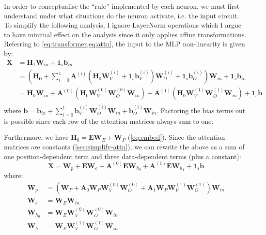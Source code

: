 \documentclass{article}
\renewcommand{\v}[1]{\mathbf{\bm{#1}}}
\newcommand{\m}[1]{\mathbf{\bm{#1}}}
\begin{document}
In order to conceptualise the ``rule'' implemented by each neuron, we must first understand under what situations do the neuron activate, i.e. the input circuit. To simplify the following analysis, I ignore LayerNorm operations which I argue to have minimal effect on the analysis since it only applies affine transformations. Referring to \cref{eq:transformer,eq:attn}, the input to the MLP non-linearity is given by:
\begin{equation*}
    \begin{aligned}
        \m{X} & = \m{H}_1 \m{W}_{in} + \v{1}_s \v{b}_{in} \\
              & = \left(
        \m{H_0}
        + \sum_{i=0}^1 \m{A}^{(i)} (
        \m{H}_0 \m{W}_V^{(i)} + \v{1}_s \v{b}_V^{(i)}
        ) \m{W}_O^{(i)} + \v{1}_s \v{b}_O^{(i)}
        \right) \m{W}_{in} + \v{1}_s \v{b}_{in}           \\
              & = \m{H}_0 \m{W}_{in}
        + \m{A}^{(0)} (\m{H}_0 \m{W}_V^{(0)} \m{W}_O^{(0)} \m{W}_{in})
        + \m{A}^{(1)} (\m{H}_0 \m{W}_V^{(1)} \m{W}_O^{(1)} \m{W}_{in})
        + \v{1}_s \v{b}                                   \\
    \end{aligned}
\end{equation*}
where $\v{b} = \v{b}_{in} + \sum_{i=0}^{1} \v{b}_V^{(i)} \m{W}_O^{(i)} \m{W}_{in} + \v{b}_O^{(i)} \m{W}_{in}$. Factoring the bias terms out is possible since each row of the attention matrices always sum to one.

Furthermore, we have $\m{H}_0 = \m{E} \m{W}_E + \m{W}_P$ (\cref{eq:embed}). Since the attention matrices are constants (\cref{sec:simplify-attn}), we can rewrite the above as a sum of one position-dependent term and three data-dependent terms (plus a constant):
\begin{equation} \label{eq:four-circuits}
    \m{X} =
    \m{W}_p
    + \m{E} \m{W}_e
    + \m{A}^{(0)} \m{E} \m{W}_{h_0}
    + \m{A}^{(1)} \m{E} \m{W}_{h_1}
    + \v{1}_s \v{b}
\end{equation}
where:
\begin{equation*}
    \begin{aligned}
        \m{W}_p
         & = \left(\m{W}_P
        + \m{A}_0 \m{W}_P \m{W}_V^{(0)} \m{W}_O^{(0)}
        + \m{A}_1 \m{W}_P \m{W}_V^{(1)} \m{W}_O^{(1)}
        \right) \m{W}_{in}                                  \\
        \m{W}_e
         & = \m{W}_E \m{W}_{in}                             \\
        \m{W}_{h_0}
         & = \m{W}_E \m{W}_V^{(0)} \m{W}_O^{(0)} \m{W}_{in} \\
        \m{W}_{h_1}
         & = \m{W}_E \m{W}_V^{(1)} \m{W}_O^{(1)} \m{W}_{in}
    \end{aligned}
\end{equation*}
\end{document}
